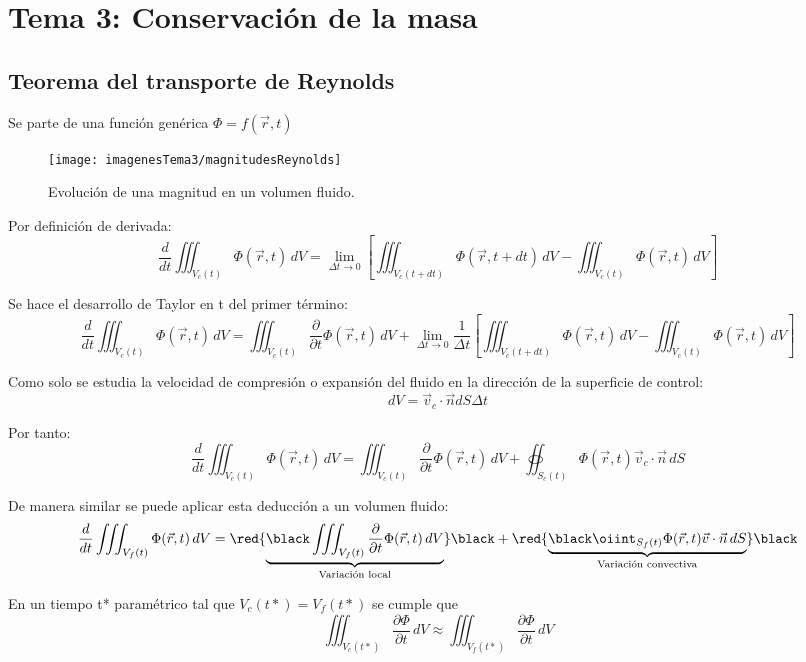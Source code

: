 \section{Tema 3: Conservación de la masa}
\subsection{Teorema del transporte de Reynolds}
Se parte de una función genérica $\Phi=f(\vec{r},t) $
\begin{figure}[H]
	\centering
	\texttt{[image: imagenesTema3/magnitudesReynolds]}
	\caption{Evolución de una magnitud en un volumen fluido.}
	\label{fig:magnitudesreynolds}
\end{figure}

Por definición de derivada:
\[\frac{d}{dt}\iiint_{V_c(t)} \Phi(\vec{r},t) \,dV=\lim_{\Delta t \to 0} \left[\iiint_{V_c(t+dt)} \Phi(\vec{r},t+dt) \,dV-\iiint_{V_c(t)} \Phi(\vec{r},t) \,dV\right]\]

Se hace el desarrollo de Taylor en t del primer término:
\[\frac{d}{dt}\iiint_{V_c(t)} \Phi(\vec{r},t) \,dV=\iiint_{V_c(t)} \frac{\partial}{\partial t}\Phi(\vec{r},t) \,dV+\lim_{\Delta t \to 0} \frac{1}{\Delta t}\left[\iiint_{V_c(t+dt)} \Phi(\vec{r},t) \,dV-\iiint_{V_c(t)} \Phi(\vec{r},t) \,dV\right]\]

Como solo se estudia la velocidad de compresión o expansión del fluido en la dirección de la superficie de control:
\[dV=\vec{v}_c\cdot\vec{n}dS\Delta t\]

Por tanto:
\begin{equation} \label{eq:1}
\frac{d}{dt}\iiint_{V_c(t)} \Phi(\vec{r},t) \,dV=\iiint_{V_c(t)} \frac{\partial}{\partial t}\Phi(\vec{r},t) \,dV+\oiint_{S_c(t)} \Phi(\vec{r},t)\vec{v}_c\cdot\vec{n} \,dS
\end{equation}

De manera similar se puede aplicar esta deducción a un volumen fluido:
\begin{equation} \label{eq:2}
\frac{d}{dt}\iiint_{V_f(t)} \Phi(\vec{r},t) \,dV=
\red{\underbrace{\black\iiint_{V_f(t)} \frac{\partial}{\partial t}\Phi(\vec{r},t) \,dV}_{\text{Variación local}}}
\black+
\red{\underbrace{\black\oiint_{S_f(t)} \Phi(\vec{r},t)\vec{v}\cdot\vec{n}\,dS}_{\text{Variación convectiva}}}
\black
\end{equation}

En un tiempo t* paramétrico tal que $V_c(t*)=V_f(t*)$ se cumple que
\[ \iiint_{V_c(t*)}\frac{\partial \Phi}{\partial t}\,dV\approx \iiint_{V_f(t*)}\frac{\partial \Phi}{\partial t}\,dV\]

